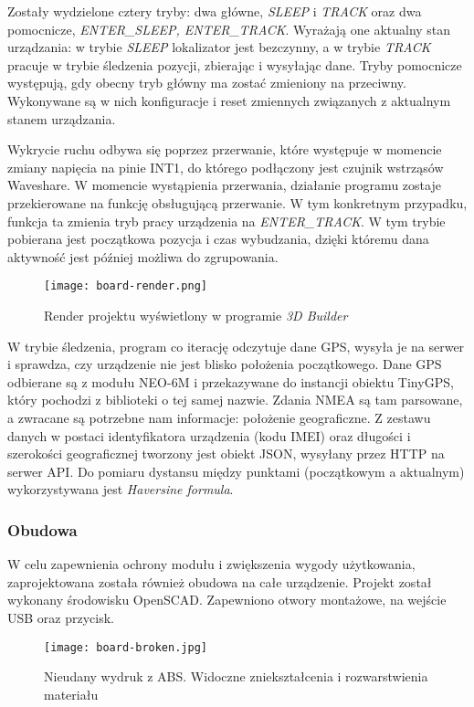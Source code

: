 \documentclass[eng,printmode]{mgr}
\begin{document}
Zostały wydzielone cztery tryby: dwa główne, \textit{SLEEP} i \textit{TRACK} oraz dwa pomocnicze, \textit{ENTER\_SLEEP, ENTER\_TRACK}. Wyrażają one aktualny stan urządzania: w trybie \textit{SLEEP} lokalizator jest bezczynny, a w trybie \textit{TRACK} pracuje w trybie śledzenia pozycji, zbierając i wysyłając dane. Tryby pomocnicze występują, gdy obecny tryb główny ma zostać zmieniony na przeciwny. Wykonywane są w nich konfiguracje i reset zmiennych związanych z aktualnym stanem urządzania.

Wykrycie ruchu odbywa się poprzez przerwanie, które występuje w momencie zmiany napięcia na pinie INT1, do którego podłączony jest czujnik wstrząsów Waveshare. W momencie wystąpienia przerwania, działanie programu zostaje przekierowane na funkcję obsługującą przerwanie. W tym konkretnym przypadku, funkcja ta zmienia tryb pracy urządzenia na \textit{ENTER\_TRACK}. W tym trybie pobierana jest początkowa pozycja i czas wybudzania, dzięki któremu dana aktywność jest później możliwa do zgrupowania. 

\begin{figure}[!htbp]
\centering
\texttt{[image: board-render.png]}
\caption{Render projektu wyświetlony w programie \textit{3D Builder} }
\end{figure}

W trybie śledzenia, program co iterację odczytuje dane GPS, wysyła je na serwer i sprawdza, czy urządzenie nie jest blisko położenia początkowego. Dane GPS odbierane są z modułu NEO-6M i przekazywane do instancji obiektu TinyGPS, który pochodzi z biblioteki o tej samej nazwie. Zdania NMEA są tam parsowane, a zwracane są potrzebne nam informacje: położenie geograficzne. Z zestawu danych w postaci identyfikatora urządzenia (kodu IMEI) oraz długości i szerokości geograficznej tworzony jest obiekt JSON, wysyłany przez HTTP na serwer API. Do pomiaru dystansu między punktami (początkowym a aktualnym) wykorzystywana jest \textit{Haversine formula}\cite{haversine}. 



\subsubsection{Obudowa}
W celu zapewnienia ochrony modułu i zwiększenia wygody użytkowania, zaprojektowana została również obudowa na całe urządzenie. Projekt został wykonany środowisku OpenSCAD. Zapewniono otwory montażowe, na wejście USB oraz przycisk.

\begin{figure}[!htbp]
\centering
\texttt{[image: board-broken.jpg]}
\caption{Nieudany wydruk z ABS. Widoczne zniekształcenia i rozwarstwienia materiału}
\end{figure}
\end{document}
